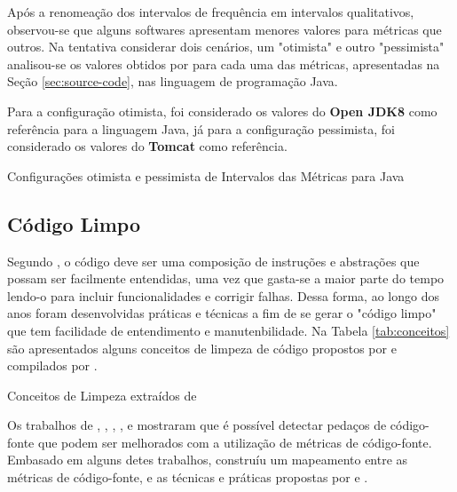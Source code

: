 \FloatBarrier

Após a renomeação dos intervalos de frequência em intervalos qualitativos, observou-se que alguns softwares apresentam menores valores para métricas que outros. Na tentativa considerar dois cenários, um "otimista" e outro "pessimista" analisou-se os valores obtidos por  para cada uma das métricas, apresentadas na Seção \ref{sec:source-code}, nas linguagem de programação Java.

Para a configuração otimista, foi considerado os valores do \textbf{Open JDK8} como referência para a linguagem Java, já para a configuração pessimista, foi considerado os valores do \textbf{Tomcat} como referência.


	
	\begin{table}[!ht]
	\begin{center}
		
	\caption{Configurações otimista e pessimista de Intervalos das Métricas para Java}
	\label{tab:good-metrics}
	\end{center}
	\end{table}
	\FloatBarrier

\subsection{Código Limpo} 
\label{sec:clean-code}

Segundo , o código deve ser uma composição de instruções e abstrações que possam ser facilmente entendidas, uma vez que gasta-se a maior parte do tempo lendo-o para incluir funcionalidades e corrigir falhas. Dessa forma, ao longo dos anos foram desenvolvidas práticas e técnicas a fim de se gerar o "código limpo" que tem facilidade de entendimento e manutenbilidade. Na Tabela \ref{tab:conceitos} são apresentados alguns conceitos de limpeza de código propostos por  e  compilados por .


\begin{table}[!ht]
\centering

\caption{Conceitos de Limpeza extraídos de }
\label{tab:conceitos}
\end{table}
\FloatBarrier

Os trabalhos de , , , ,  e  mostraram que é possível detectar pedaços de código-fonte que podem ser melhorados com a utilização de métricas de código-fonte. Embasado em alguns detes trabalhos,  construíu um mapeamento entre as métricas de código-fonte, e as técnicas e práticas propostas por  e . 

